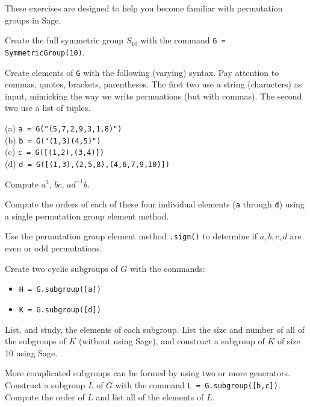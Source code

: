 These exercises are designed to help you become familiar with permutation groups in Sage.
%
\begin{sageverbatim}\end{sageverbatim}
%
%
Create the full symmetric group $S_{10}$ with the command \verb?G = SymmetricGroup(10)?.
\begin{sageverbatim}\end{sageverbatim}
%
Create elements of \verb?G? with the following (varying) syntax.  Pay attention to commas, quotes, brackets, parentheses.  The first two use a string (characters) as input, mimicking the way we write permuations (but with commas).  The second two use a list of tuples.\par\noindent
(a) \verb?a = G("(5,7,2,9,3,1,8)")?\\
(b) \verb?b = G("(1,3)(4,5)")?\\
(c) \verb?c = G([(1,2),(3,4)])?\\
(d) \verb?d = G([(1,3),(2,5,8),(4,6,7,9,10)])?
\begin{sageverbatim}\end{sageverbatim}
%
%
Compute $a^3$, $bc$, $ad^{-1}b$.
\begin{sageverbatim}\end{sageverbatim}
%
%
Compute the orders of each of these four individual elements (\verb?a? through \verb?d?) using a single permutation group element method.
\begin{sageverbatim}\end{sageverbatim}
%
Use the permutation group element method \verb?.sign()? to determine if $a,b,c,d$ are even or odd permutations.
\begin{sageverbatim}\end{sageverbatim}
%
Create two cyclic subgroups of $G$ with the commands:
%
\begin{itemize}
\item\verb?H = G.subgroup([a])?
\item\verb?K = G.subgroup([d])?
\end{itemize}
%
List, and study, the elements of each subgroup.  List the size and number of all of the subgroups of $K$ (without using Sage), and construct a subgroup of $K$ of size 10 using Sage.
\begin{sageverbatim}\end{sageverbatim}
%
More complicated subgroups can be formed by using two or more generators.  Construct a subgroup $L$ of $G$ with the command \verb?L = G.subgroup([b,c])?.  Compute the order of $L$ and list all of the elements of $L$.
